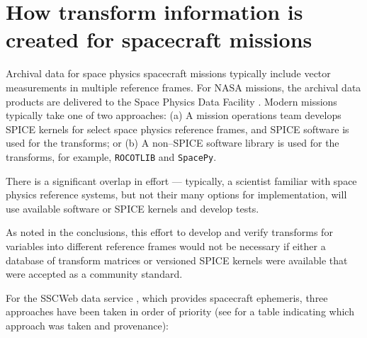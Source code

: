 \documentclass[draft]{agujournal2019}
\begin{document}
\section{How transform information is created for spacecraft missions}
\label{sect:missions}

Archival data for space physics spacecraft missions typically include vector measurements in multiple reference frames. For NASA missions, the archival data products are delivered to the Space Physics Data Facility \cite{SPDF}. Modern missions typically take one of two approaches: (a) A mission operations team develops SPICE kernels for select space physics reference frames, and SPICE software is used for the transforms; or (b) A non--SPICE software library is used for the transforms, for example, \texttt{ROCOTLIB} and \texttt{SpacePy}. 

There is a significant overlap in effort --- typically, a scientist familiar with space physics reference systems, but not their many options for implementation, will use available software or SPICE kernels and develop tests. 

As noted in the conclusions, this effort to develop and verify transforms for variables into different reference frames would not be necessary if either a database of transform matrices or versioned SPICE kernels were available that were accepted as a community standard.

For the SSCWeb data service \cite{SSCWeb}, which provides spacecraft ephemeris, three approaches have been taken in order of priority (see  for a table indicating which approach was taken and provenance):
\end{document}
